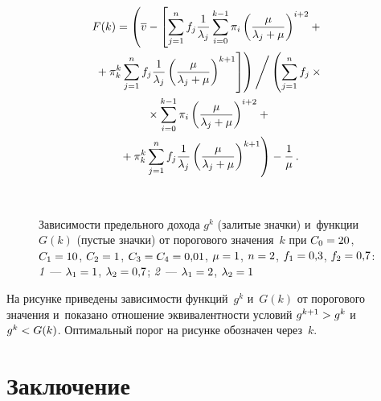 \begin{multicols}{2}
  \vspace*{-2pt}
  
  \noindent
  \begin{multline*}
  F(k) =\left(\overline{v} -\left[ \sum\limits^n_{j=1} f_j \displaystyle\frac{\displaystyle 1\mathstrut}{\displaystyle \lambda_j\mathstrut} 
\sum\limits^{k-1}_{i=0} \pi_i \left(\displaystyle\frac{\displaystyle \mu\mathstrut}{\displaystyle \lambda_j+\mu\mathstrut}\right)^{i+2} +{}\right.\right.\\
\left.\left.{}+ \pi_k^k 
\sum\limits^n_{j=1} f_j \displaystyle\frac{\displaystyle 1\mathstrut}{\displaystyle \lambda_j\mathstrut} 
\left(\displaystyle\frac{\displaystyle \mu\mathstrut}{\displaystyle \lambda_j+\mu\mathstrut}\right)^{k+1}\right]\right)\Bigg/ 
\left(\sum\limits^n_{j=1} f_j \times{}\right.\\
{}\times\sum\limits_{i=0}^{k-1} \pi_i 
\left(\displaystyle\frac{\displaystyle \mu\mathstrut}{\displaystyle \lambda_j+\mu\mathstrut}\right)^{i+2} +{}\\
\left.{}+ \pi_k^k \sum\limits^n_{j=1} f_j 
\displaystyle\frac{\displaystyle 1\mathstrut}{\displaystyle \lambda_j\mathstrut} 
\left(\displaystyle\frac{\displaystyle \mu\mathstrut}{\displaystyle \lambda_j+\mu\mathstrut}\right)^{k+1}\right) - \displaystyle\frac{\displaystyle 1\mathstrut}{\displaystyle \mu\mathstrut}\,.
  \end{multline*}
  
  
  \begin{figure*} %
    \vspace*{1pt}
 \begin{center}
 \mbox{%
 \epsfxsize=100.25mm 
 }

\vspace*{6pt}

  {\small Зависимости предельного дохода $g^k$ (залитые значки)
  и~функции~$G(k)$ (пустые значки) от порогового 
значения~$k$ при $C_0\hm=20$, 
$C_1\hm=10$, $C_2\hm=1$, $C_3\hm=C_4\hm=0{,}01$, $\mu\hm=1$, $n\hm=2$, 
$f_1\hm= 0{,}3$, $f_2\hm=0{,}7$:
\textit{1}~--- $\lambda_1\hm=1$, $\lambda_2\hm=0{,}7$; 
\textit{2}~--- $\lambda_1\hm=2$, $\lambda_2\hm=1$ 
}

\end{center}
\vspace*{-9pt}
  \end{figure*}
  
  На рисунке приведены зависимости функций~$g^k$ и~$G(k)$ от порогового 
значения и~показано отношение эквивалентности условий $g^{k+1}\hm> g^k$ 
и~$g^k\hm< G(k)$. 
Оптимальный порог на рисунке обозначен через~$k$.

\vspace*{-5pt}
  
  \section{Заключение}
  
  \vspace*{-2pt}
  

\end{multicols}
